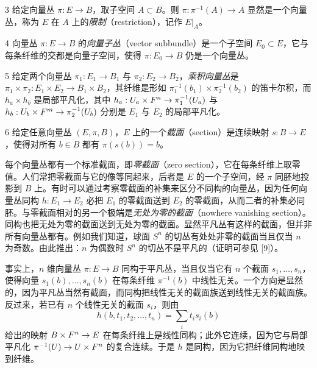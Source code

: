 \begin{defn}{3}
给定向量丛 $\pi: E\to B$，取子空间 $A\subset B$。则 $\pi: \pi^{-1}(A)\to A$ 显然是一个向量丛，称为 $E$ 在 $A$ 上的\emph{限制}（restriction），记作 $E|_A$。
\end{defn}

\begin{defn}{4}
向量丛 $\pi: E\to B$ 的\emph{向量子丛}（vector subbundle）是一个子空间 $E_0\subset E$，它与每条纤维的交都是向量子空间，使得 $\pi: E_0\to B$ 仍是一个向量丛。
\end{defn}

\begin{defn}{5}
给定两个向量丛 $\pi_1: E_1\to B_1$ 与 $\pi_2: E_2\to B_2$，\emph{乘积向量丛}是 $\pi_1\times\pi_2: E_1\times E_2\to B_1\times B_2$，其纤维是形如 $\pi_1^{-1}(b_1)\times\pi_2^{-1}(b_2)$ 的笛卡尔积，而 $h_a\times h_b$ 是局部平凡化，其中 $h_a: U_a\times F^n\to\pi_1^{-1}(U_a)$ 与 $h_b: U_b\times F^m\to\pi_2^{-1}(U_b)$ 分别是 $E_1$ 与 $E_2$ 的局部平凡化。
\end{defn}

\begin{defn}{6}
给定任意向量丛 $(E,\pi,B)$，$E$ 上的一个\emph{截面}（section）是连续映射 $s: B\to E$，使得对所有 $b\in B$ 都有 $\pi(s(b))=b$。
\end{defn}

每个向量丛都有一个标准截面，即\emph{零截面}（zero section），它在每条纤维上取零值。人们常把零截面与它的像等同起来，后者是 $E$ 的一个子空间，经 $\pi$ 同胚地投影到 $B$ 上。有时可以通过考察零截面的补集来区分不同构的向量丛，因为任何向量丛同构 $h: E_1\to E_2$ 必把 $E_1$ 的零截面送到 $E_2$ 的零截面，从而二者的补集必同胚。与零截面相对的另一个极端是\emph{无处为零的截面}（nowhere vanishing section）。同构也把无处为零的截面送到无处为零的截面。显然平凡丛有这样的截面，但并非所有向量丛都有。例如我们知道，球面 $S^n$ 的切丛有处处非零的截面当且仅当 $n$ 为奇数。由此推出：$n$ 为偶数时 $S^n$ 的切丛不是平凡的（证明可参见 [9]）。


事实上，$n$ 维向量丛 $\pi: E\to B$ 同构于平凡丛，当且仅当它有 $n$ 个截面 $s_1,\dots,s_n$，使得向量 $s_1(b),\dots,s_n(b)$ 在每条纤维 $\pi^{-1}(b)$ 中线性无关。一个方向是显然的，因为平凡丛当然有截面，而同构把线性无关的截面族送到线性无关的截面族。反过来，若已有 $n$ 个线性无关的截面 $s_i$，则由
\[ h(b,t_1,t_2,\dots,t_n)=\sum_i t_i s_i(b) \]
给出的映射 $B\times F^n\to E$ 在每条纤维上是线性同构；此外它连续，因为它与局部平凡化 $\pi^{-1}(U)\to U\times F^n$ 的复合连续。于是 $h$ 是同构，因为它把纤维同构地映到纤维。

